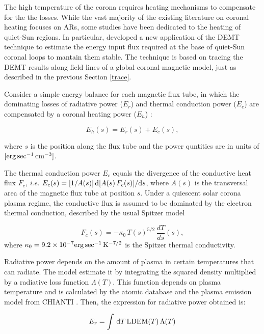 \documentclass[namedreferences]{solarphysics}
\newcommand{\LDEM}{{\rm LDEM}}
\begin{document}
\begin{article}
{The high temperature of the corona requires heating mechanisms to compensate for the the losses. While the vast majority of the existing literature on coronal heating focuses on ARs, some studies have been dedicated to the heating of quiet-Sun regions. In particular,  \citet{maccormack_2017} developed a new application of the DEMT technique to estimate the energy input flux required at the base of quiet-Sun coronal loops to mantain them stable. The technique is based on tracing the DEMT results along field lines of a global coronal magnetic model, just as described in the previous Section \ref{trace}.}

{Consider} a simple energy balance for each magnetic flux tube, {in which the dominating losses of} radiative power ($E_r$) and thermal conduction power ($E_c$) are compensated {by a} coronal heating power ($E_h$) \citep{aschwanden_2004}:

\begin{equation}\label{Balance}
E_h(s) = E_r(s)+ E_c(s),
\end{equation}

\noindent
where $s$ is the position along {the flux tube} and the {power quntities} are in units of $[{\rm erg\,sec^{-1}\,cm^{-3}}]$.

{The thermal conduction power $E_c$ equals the divergence of the conductive heat flux $F_c$, \textit{i.e.} $E_c(s)=[1/A(s)]\,{\rm d}[A(s)\,F_c(s)]/{\rm d}s$, where $A(s)$ is the transversal area of the magnetic flux tube at position $s$. Under a quiescent solar corona plasma regime, the conductive flux is assumed to be dominated by the electron thermal conduction, described by the usual Spitzer model \citep{spitzer_1962}

\begin{equation}\label{Fc}
F_c(s)=-\kappa_0\,{T(s)}^{5/2}\,\frac{dT}{ds}(s),
\end{equation}
where $\kappa_0 = 9.2 \times 10^{-7}  {\rm erg\,sec^{-1}\,K^{-7/2}}$ is the Spitzer thermal conductivity.}

Radiative power depends on the amount of plasma in certain temperatures that can radiate. The model estimate it by integrating the squared density multiplied by a radiative loss function $\Lambda(T)$. This function depends on plasma temperature and is calculated by the atomic database and the plasma emission model from CHIANTI \citep{delzanna_2015}. Then, the expression for radiative power obtained is:

\begin{equation}\label{Er}
E_r = \int\,\textrm{d}T\,\LDEM(T)\,\Lambda(T)
\end{equation}


\end{article}
\end{document}
